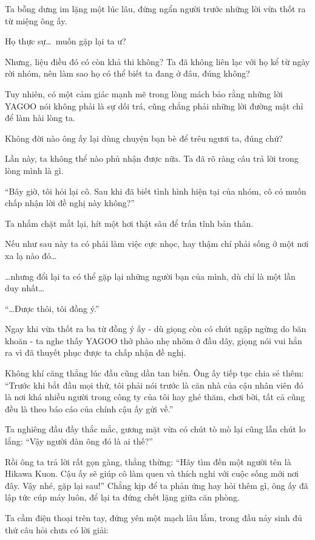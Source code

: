 \documentclass[../main.tex]{subfiles}
\begin{document}
Ta bỗng dưng im lặng một lúc lâu, đứng ngẩn người trước những lời vừa thốt ra từ miệng ông ấy.

Họ thực sự\dots\ muốn gặp lại ta ư?

Nhưng, liệu điều đó có còn khả thi không? Ta đã không liên lạc với họ kể từ ngày rời nhóm, nên làm sao họ có thể biết ta đang ở đâu, đúng không?

Tuy nhiên, có một cảm giác mạnh mẽ trong lòng mách bảo rằng những lời YAGOO nói không phải là sự dối trá, cũng chẳng phải những lời đường mật chỉ để làm hài lòng ta.

Không đời nào ông ấy lại dùng chuyện bạn bè để trêu ngươi ta, đúng chứ?

Lần này, ta không thể nào phủ nhận được nữa. Ta đã rõ ràng câu trả lời trong lòng mình là gì.

``Bây giờ, tôi hỏi lại cô. Sau khi đã biết tình hình hiện tại của nhóm, cô có muốn chấp nhận lời đề nghị này không?''

Ta nhắm chặt mắt lại, hít một hơi thật sâu để trấn tĩnh bản thân.

Nếu như sau này ta có phải làm việc cực nhọc, hay thậm chí phải sống ở một nơi xa lạ nào đó\dots

\dots nhưng đổi lại ta có thể gặp lại những người bạn của mình, dù chỉ là một lần duy nhất\dots

``\dots Được thôi, tôi đồng ý.''

Ngay khi vừa thốt ra ba từ đồng ý ấy - dù giọng còn có chút ngập ngừng do băn khoăn - ta nghe thấy YAGOO thở phào nhẹ nhõm ở đầu dây, giọng nói vui hẳn ra vì đã thuyết phục được ta chấp nhận đề nghị.

Không khí căng thẳng lúc đầu cũng dần tan biến. Ông ấy tiếp tục chia sẻ thêm: ``Trước khi bắt đầu mọi thứ, tôi phải nói trước là căn nhà của cậu nhân viên đó là nơi khá nhiều người trong công ty của tôi hay ghé thăm, chơi bời, tất cả cũng đều là theo báo cáo của chính cậu ấy gửi về.''

Ta nghiêng đầu đầy thắc mắc, gương mặt vừa có chút tò mò lại cũng lẫn chút lo lắng: ``Vậy người đàn ông đó là ai thế?''

Rồi ông ta trả lời rất gọn gàng, thẳng thừng: ``Hãy tìm đến một người tên là Hikawa Kuon. Cậu ấy sẽ giúp cô làm quen và thích nghi với cuộc sống mới nơi đây. Vậy nhé, gặp lại sau!'' Chẳng kịp để ta phản ứng hay hỏi thêm gì, ông ấy đã lập tức cúp máy luôn, để lại ta đứng chết lặng giữa căn phòng.

Ta cầm điện thoại trên tay, đứng yên một mạch lâu lắm, trong đầu nảy sinh đủ thứ câu hỏi chưa có lời giải:
\end{document}

